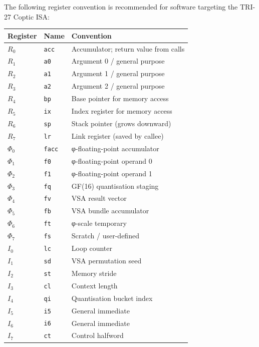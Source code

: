 The following register convention is recommended for software
targeting the TRI-27 Coptic ISA:

\begin{longtable}[]{@{}llp{6cm}@{}}
\toprule\noalign{}
Register & Name & Convention \\
\midrule\noalign{}
\endhead
\bottomrule\noalign{}
\endlastfoot
\(R_0\) & \texttt{acc} & Accumulator; return value from calls \\
\(R_1\) & \texttt{a0} & Argument 0 / general purpose \\
\(R_2\) & \texttt{a1} & Argument 1 / general purpose \\
\(R_3\) & \texttt{a2} & Argument 2 / general purpose \\
\(R_4\) & \texttt{bp} & Base pointer for memory access \\
\(R_5\) & \texttt{ix} & Index register for memory access \\
\(R_6\) & \texttt{sp} & Stack pointer (grows downward) \\
\(R_7\) & \texttt{lr} & Link register (saved by callee) \\
\(\Phi_0\) & \texttt{facc} & φ-floating-point accumulator \\
\(\Phi_1\) & \texttt{f0} & φ-floating-point operand 0 \\
\(\Phi_2\) & \texttt{f1} & φ-floating-point operand 1 \\
\(\Phi_3\) & \texttt{fq} & GF(16) quantisation staging \\
\(\Phi_4\) & \texttt{fv} & VSA result vector \\
\(\Phi_5\) & \texttt{fb} & VSA bundle accumulator \\
\(\Phi_6\) & \texttt{ft} & φ-scale temporary \\
\(\Phi_7\) & \texttt{fs} & Scratch / user-defined \\
\(I_0\) & \texttt{lc} & Loop counter \\
\(I_1\) & \texttt{sd} & VSA permutation seed \\
\(I_2\) & \texttt{st} & Memory stride \\
\(I_3\) & \texttt{cl} & Context length \\
\(I_4\) & \texttt{qi} & Quantisation bucket index \\
\(I_5\) & \texttt{i5} & General immediate \\
\(I_6\) & \texttt{i6} & General immediate \\
\(I_7\) & \texttt{ct} & Control halfword \\
\end{longtable}

